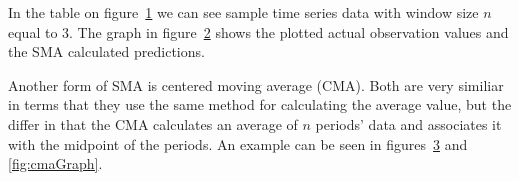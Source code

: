 In the table on figure~\ref{fig:smaTable} we can see sample time series data with window size $n$ equal to $3$. The graph in figure~\ref{fig:smaGraph} shows the plotted actual observation values and the SMA calculated predictions.

\begin{figure}[ht]
	\caption{}
	\label{fig:smaTable}
\end{figure}

\begin{figure}[ht]
	\caption{}
	\label{fig:smaGraph}
\end{figure}

Another form of SMA is centered moving average (CMA). Both are very similiar in terms that they use the same method for calculating the average value, but the differ in that the CMA calculates an average of $n$ periods' data and associates it with the midpoint of the periods. An example can be seen in figures~\ref{fig:cmaTable} and \ref{fig:cmaGraph}.

\begin{figure}[ht]
	\caption{}
	\label{fig:cmaTable}
\end{figure}

